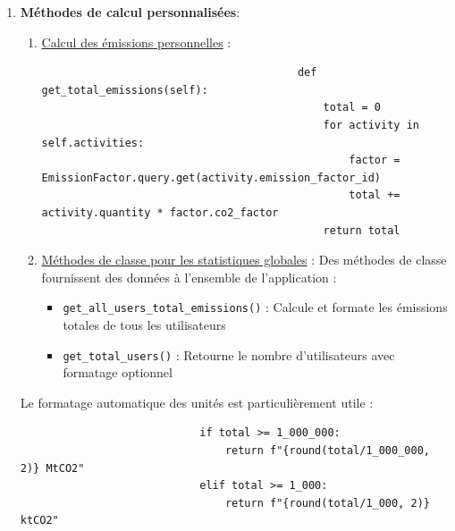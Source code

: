 \documentclass[a4paper,11pt]{article}
\begin{document}
\begin{enumerate}
                    \item \textbf{Méthodes de calcul personnalisées}:\\
                        \noindent 
                        \begin{enumerate}
                            \item \underline{Calcul des émissions personnelles} :
                                \begin{tcolorbox}[colback=lightgray!6, colframe=black, left=-70mm, right=5mm, top=2mm, bottom=0mm, boxrule=0.1mm]
                                    \begin{verbatim}
                                        def get_total_emissions(self):
                                            total = 0
                                            for activity in self.activities:
                                                factor = EmissionFactor.query.get(activity.emission_factor_id)
                                                total += activity.quantity * factor.co2_factor
                                            return total
                                    \end{verbatim}
                                \end{tcolorbox}

                            \item \underline{Méthodes de classe pour les statistiques globales} :
                                \noindent Des méthodes de classe fournissent des données à l'ensemble de l'application :
                                \begin{itemize}
                                    \item \texttt{get\_all\_users\_total\_emissions()} : Calcule et formate les émissions totales de tous les utilisateurs
                                    \item \texttt{get\_total\_users()} : Retourne le nombre d'utilisateurs avec formatage optionnel
                                \end{itemize}
                        \end{enumerate}

                    \noindent Le formatage automatique des unités est particulièrement utile :
                    
                    \begin{tcolorbox}[colback=lightgray!6, colframe=black, left=-45mm, right=5mm, top=2mm, bottom=0mm, boxrule=0.1mm]
                        \begin{verbatim}
                            if total >= 1_000_000:
                                return f"{round(total/1_000_000, 2)} MtCO2"
                            elif total >= 1_000:
                                return f"{round(total/1_000, 2)} ktCO2"
                        \end{verbatim}
                    \end{tcolorbox}
                \end{enumerate}
\end{document}
